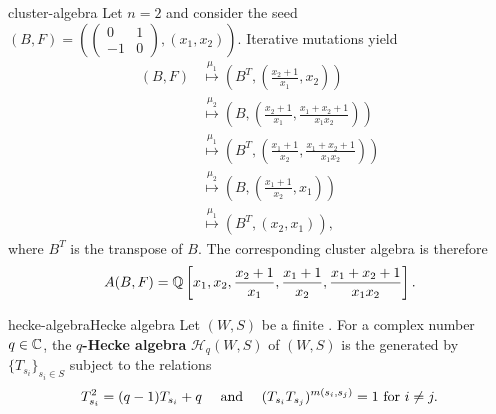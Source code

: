 \begin{example}{cluster-algebra}
    Let $n = 2$ and consider the seed $(B, F) = \left(\begin{pmatrix} 0 & 1 \\ -1 & 0 \end{pmatrix}, (x_1, x_2)\right)$. Iterative mutations yield
    \[ \begin{aligned}
        (B, F) &\overset{\mu_1}{\mapsto} \left(B^T, \left(\frac{x_2 + 1}{x_1}, x_2\right)\right) \\ &\overset{\mu_2}{\mapsto} \left(B, \left(\frac{x_2 + 1}{x_1}, \frac{x_1 + x_2 + 1}{x_1 x_2}\right)\right) \\ &\overset{\mu_1}{\mapsto} \left(B^T, \left(\frac{x_1 + 1}{x_2}, \frac{x_1 + x_2 + 1}{x_1 x_2}\right)\right) \\ &\overset{\mu_2}{\mapsto} \left(B, \left(\frac{x_1 + 1}{x_2}, x_1\right)\right) \\ &\overset{\mu_1}{\mapsto} \left(B^T, \left(x_2, x_1\right)\right) , \end{aligned} \]
    where $B^T$ is the transpose of $B$. The corresponding cluster algebra is therefore
    \[ A(B, F) = \mathbb{Q}\left[ x_1, x_2, \frac{x_2 + 1}{x_1}, \frac{x_1 + 1}{x_2}, \frac{x_1 + x_2 + 1}{x_1 x_2} \right] . \]
\end{example}

\begin{topic}{hecke-algebra}{Hecke algebra}
    Let $(W, S)$ be a finite . For a complex number $q \in \mathbb{C}$, the \textbf{$q$-Hecke algebra} $\mathcal{H}_q(W, S)$ of $(W, S)$ is the  generated by $\{ T_{s_i} \}_{s_i \in S}$ subject to the relations
    \[ T_{s_i}^2 = (q - 1) T_{s_i} + q \quad \textup{ and } \quad (T_{s_i} T_{s_j})^{m(s_i, s_j)} = 1 \textup{ for } i \ne j . \]
\end{topic}

